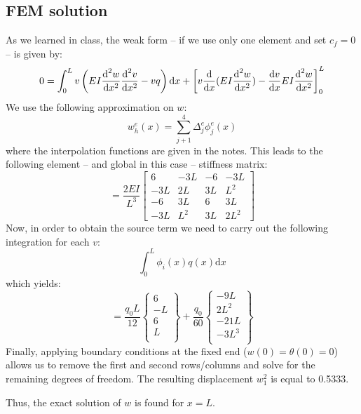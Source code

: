 \subsection{FEM solution}
As we learned in class, the weak form -- if we use only one element and
set $c_f = 0$ -- is given by:
\begin{equation}
    \label{eq:weakbeam}
    0 = \int_0^L v\left(
        EI  \frac{\text{d}^2w}{\text{d}x^2} \frac{\text{d}^2 v}{\text{d}x^2} - vq
    \right) \text{d}x
    + \left[
        v  \frac{\text{d}}{\text{d}x}(EI \frac{\text{d}^2 w}{\text{d}x^2}) -  \frac{\text{d}v}{\text{d}x}EI \frac{\text{d}^2w}{\text{d}x^2}
    \right]^L_0
\end{equation}
We use the following approximation on $w$:
\begin{equation}
    w_h^e(x) = \sum_{j+1}^4 \Delta_j^e \phi_j^e(x)
\end{equation}
where the interpolation functions are given in the notes. This leads to the following
element -- and global in this case -- stiffness matrix:
\begin{equation}
    [K] = \frac{2 E I}{L^3} \left[ \begin{array}{cccc}
        6 & -3L & -6 & -3L\\
        -3L & 2L & 3L & L^2\\
        -6 & 3L & 6 & 3L\\
        -3L & L^2 & 3L & 2L^2
    \end{array} \right]
\end{equation}
Now, in order to obtain the source term we need to carry out the following integration for
each $v$:
$$
    \int_0^L \phi_i(x) q(x) \text{d}x
$$
which yields:
\begin{equation}
    [Q] = \frac{q_0 L}{12} \left \{ \begin{array}{c}
        6 \\ -L \\ 6 \\ L\\
    \end{array} \right \} + \frac{q_0}{60} \left \{ \begin{array}{c}
        -9L \\ 2L^2 \\ -21L \\ -3L^3 \\
    \end{array} \right \}
\end{equation}
Finally, applying boundary conditions at the fixed end ($w(0) = \theta(0) = 0$) allows
us to remove the first and second rows/columns and solve for the remaining degrees
of freedom. The resulting displacement $w_1^2$ is equal to 0.5333.

Thus, the exact solution of $w$ is found for $x = L$.
